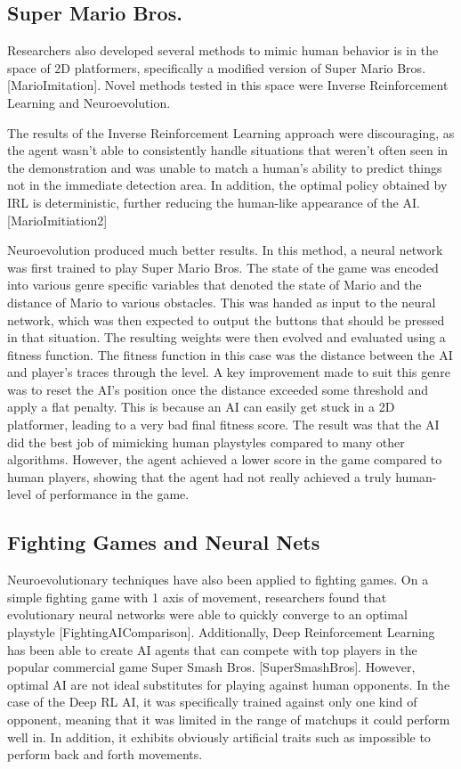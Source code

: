 \documentclass{article}
\begin{document}
\subsection{Super Mario Bros.}
Researchers also developed several methods to mimic human behavior is in the space of 2D platformers, specifically a modified version of Super Mario Bros. [MarioImitation]. Novel methods tested in this space were Inverse Reinforcement Learning and Neuroevolution. 

The results of the Inverse Reinforcement Learning approach were discouraging, as the agent wasn't able to consistently handle situations that weren't often seen in the demonstration and was unable to match a human's ability to predict things not in the immediate detection area. In addition, the optimal policy obtained by IRL is deterministic, further reducing the human-like appearance of the AI.[MarioImitiation2]

Neuroevolution produced much better results. In this method, a neural network was first trained to play Super Mario Bros. The state of the game was encoded into various genre specific variables that denoted the state of Mario and the distance of Mario to various obstacles. This was handed as input to the neural network, which was then expected to output the buttons that should be pressed in that situation. The resulting weights were then evolved and evaluated using a fitness function. The fitness function in this case was the distance between the AI and player's traces through the level. A key improvement made to suit this genre was to reset the AI's position once the distance exceeded some threshold and apply a flat penalty. This is because an AI can easily get stuck in a 2D platformer, leading to a very bad final fitness score. The result was that the AI did the best job of mimicking human playstyles compared to many other algorithms. However, the agent achieved a lower score in the game compared to human players, showing that the agent had not really achieved a truly human-level of performance in the game.

\subsection{Fighting Games and Neural Nets}
Neuroevolutionary techniques have also been applied to fighting games. On a simple fighting game with 1 axis of movement, researchers found that evolutionary neural networks were able to quickly converge to an optimal playstyle [FightingAIComparison]. Additionally, Deep Reinforcement Learning has been able to create AI agents that can compete with top players in the popular commercial game Super Smash Bros. [SuperSmashBros]. However, optimal AI are not ideal substitutes for playing against human opponents. In the case of the Deep RL AI, it was specifically trained against only one kind of opponent, meaning that it was limited in the range of matchups it could perform well in. In addition, it exhibits obviously artificial traits such as impossible to perform back and forth movements.
\end{document}
